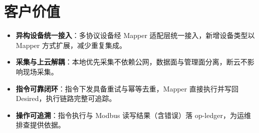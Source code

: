 \section{客户价值}

\begin{itemize}
  \item \textbf{异构设备统一接入}：多协议设备经 Mapper 适配层统一接入，新增设备类型以 Mapper 方式扩展，减少重复集成。
  \item \textbf{采集与上云解耦}：本地优先采集不依赖公网，数据面与管理面分离，断云不影响现场采集。
  \item \textbf{指令可靠闭环}：指令下发具备重试与幂等去重，Mapper 直接执行并写回 Desired，执行链路完整可追踪。
  \item \textbf{操作可追溯}：指令执行与 Modbus 读写结果（含错误）落 op-ledger，为运维排查提供依据。
\end{itemize}
